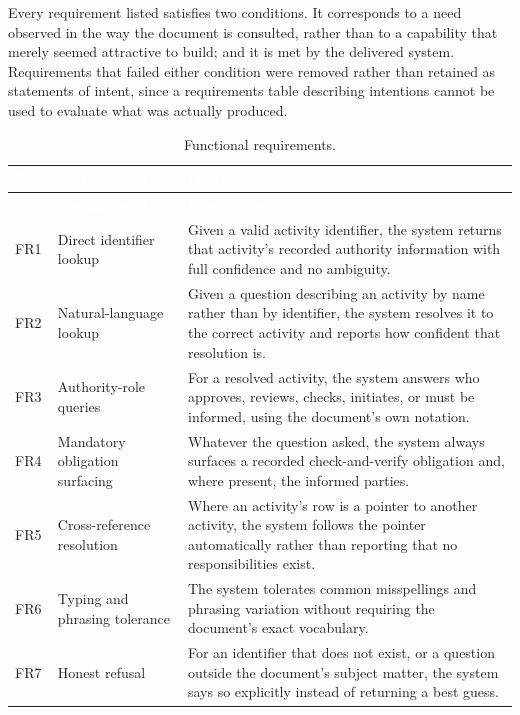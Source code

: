 Every requirement listed satisfies two conditions. It corresponds to a need observed in the way the document is consulted, rather than to a capability that merely seemed attractive to build; and it is met by the delivered system. Requirements that failed either condition were removed rather than retained as statements of intent, since a requirements table describing intentions cannot be used to evaluate what was actually produced.

\begin{longtable}{|p{}|p{}|p{}|}
\caption{Functional requirements.}\label{tab:fr}\\
\hline
\rowcolor{myblue}\textcolor{white}{\textbf{Ref.}} & \textcolor{white}{\textbf{Requirement}} & \textcolor{white}{\textbf{Description}} \\
\hline
\endfirsthead
\hline
\rowcolor{myblue}\textcolor{white}{\textbf{Ref.}} & \textcolor{white}{\textbf{Requirement}} & \textcolor{white}{\textbf{Description}} \\
\hline
\endhead
FR1 & Direct identifier lookup & Given a valid activity identifier, the system returns that activity's recorded authority information with full confidence and no ambiguity. \\ \hline
FR2 & Natural-language lookup & Given a question describing an activity by name rather than by identifier, the system resolves it to the correct activity and reports how confident that resolution is. \\ \hline
FR3 & Authority-role queries & For a resolved activity, the system answers who approves, reviews, checks, initiates, or must be informed, using the document's own notation. \\ \hline
FR4 & Mandatory obligation surfacing & Whatever the question asked, the system always surfaces a recorded check-and-verify obligation and, where present, the informed parties. \\ \hline
FR5 & Cross-reference resolution & Where an activity's row is a pointer to another activity, the system follows the pointer automatically rather than reporting that no responsibilities exist. \\ \hline
FR6 & Typing and phrasing tolerance & The system tolerates common misspellings and phrasing variation without requiring the document's exact vocabulary. \\ \hline
FR7 & Honest refusal & For an identifier that does not exist, or a question outside the document's subject matter, the system says so explicitly instead of returning a best guess. \\ \hline

\end{longtable}
